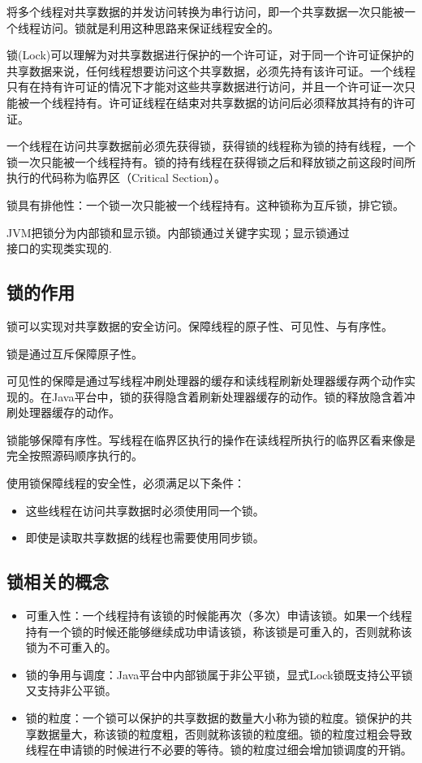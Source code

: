 \documentclass[a4paper]{report}
\begin{document}
将多个线程对共享数据的并发访问转换为串行访问，即一个共享数据一次只能被一个线程访问。锁就是利用这种思路来保证线程安全的。

锁(Lock)可以理解为对共享数据进行保护的一个许可证，对于同一个许可证保护的共享数据来说，任何线程想要访问这个共享数据，必须先持有该许可证。一个线程只有在持有许可证的情况下才能对这些共享数据进行访问，并且一个许可证一次只能被一个线程持有。许可证线程在结束对共享数据的访问后必须释放其持有的许可证。

一个线程在访问共享数据前必须先获得锁，获得锁的线程称为锁的持有线程，一个锁一次只能被一个线程持有。锁的持有线程在获得锁之后和释放锁之前这段时间所执行的代码称为临界区（Critical Section）。

锁具有排他性：一个锁一次只能被一个线程持有。这种锁称为互斥锁，排它锁。

JVM把锁分为内部锁和显示锁。内部锁通过关键字实现；显示锁通过\\
接口的实现类实现的.

\subsection{锁的作用}
锁可以实现对共享数据的安全访问。保障线程的原子性、可见性、与有序性。

锁是通过互斥保障原子性。

可见性的保障是通过写线程冲刷处理器的缓存和读线程刷新处理器缓存两个动作实现的。在Java平台中，锁的获得隐含着刷新处理器缓存的动作。锁的释放隐含着冲刷处理器缓存的动作。

锁能够保障有序性。写线程在临界区执行的操作在读线程所执行的临界区看来像是完全按照源码顺序执行的。

使用锁保障线程的安全性，必须满足以下条件：
\begin{itemize}
  \item 这些线程在访问共享数据时必须使用同一个锁。
  \item 即使是读取共享数据的线程也需要使用同步锁。
\end{itemize}
\subsection{锁相关的概念}
\begin{itemize}
  \item 可重入性：一个线程持有该锁的时候能再次（多次）申请该锁。如果一个线程持有一个锁的时候还能够继续成功申请该锁，称该锁是可重入的，否则就称该锁为不可重入的。
  \item 锁的争用与调度：Java平台中内部锁属于非公平锁，显式Lock锁既支持公平锁又支持非公平锁。
  \item 锁的粒度：一个锁可以保护的共享数据的数量大小称为锁的粒度。锁保护的共享数据量大，称该锁的粒度粗，否则就称该锁的粒度细。锁的粒度过粗会导致线程在申请锁的时候进行不必要的等待。锁的粒度过细会增加锁调度的开销。
\end{itemize}
\end{document}
